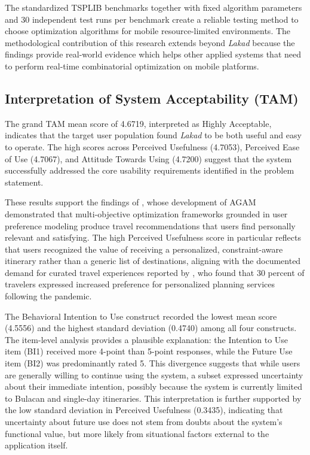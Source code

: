 The standardized TSPLIB benchmarks together with fixed algorithm parameters and 30
independent test runs per benchmark create a reliable testing method to choose optimization algorithms for
mobile resource-limited environments. The methodological contribution
of this research extends beyond \textit{Lakad} because the findings provide
real-world evidence which helps other applied systems that need to
perform real-time combinatorial optimization on mobile platforms.

\subsection{Interpretation of System Acceptability (TAM)}
 
The grand TAM mean score of 4.6719, interpreted as Highly Acceptable,
indicates that the target user population  found \textit{Lakad} to be both useful and easy to operate.
The high scores across Perceived Usefulness (4.7053), Perceived Ease of
Use (4.7067), and Attitude Towards Using (4.7200) suggest that the
system successfully addressed the core usability requirements identified
in the problem statement.

These results support the findings of \textcite{Yochum2020}, whose
development of AGAM demonstrated that multi-objective optimization
frameworks grounded in user preference modeling produce travel
recommendations that users find personally relevant and satisfying.
The high Perceived Usefulness score in particular reflects that users
recognized the value of receiving a personalized, constraint-aware
itinerary rather than a generic list of destinations, aligning with the documented demand for curated travel experiences reported by \textcite{SkiftState2022}, who found that 30 percent of travelers expressed increased preference for personalized planning services following the pandemic.
 
The Behavioral Intention to Use construct recorded the lowest mean score
(4.5556) and the highest standard deviation (0.4740) among all four
constructs. The item-level analysis provides a plausible explanation:
the Intention to Use item (BI1) received more 4-point than 5-point
responses, while the Future Use item (BI2) was predominantly rated 5.
This divergence suggests that while users are generally willing to
continue using the system, a subset expressed uncertainty about their
immediate intention, possibly because the system is currently limited
to Bulacan and single-day itineraries. This interpretation is further supported by the low standard
deviation in Perceived Usefulness (0.3435), indicating that uncertainty
about future use does not stem from doubts about the system’s functional value, but more likely from situational factors external to the application itself.
 
